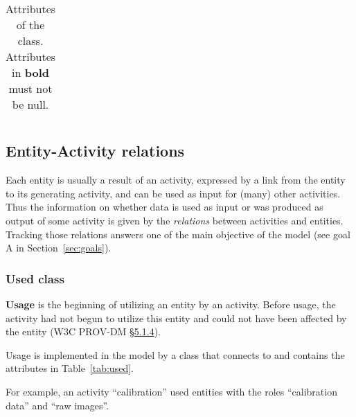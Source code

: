\begin{table}[ht]
\begin{tabulary}{1.0\textwidth}{llL}
\bottomrule
\end{tabulary}
\caption[Attributes of the  class.]{Attributes of the  class. Attributes in \textbf{bold} must not be null.}\label{tab:activity}
\end{table}




\subsection{Entity-Activity relations}
\label{sec:entity-activity-relations}

Each entity is usually a result of an activity, expressed by a link from the entity to its generating activity, and can be used as input for (many) other activities.
Thus the information on whether data is used as input or was produced as output of some activity is given by the \emph{relations} between activities and entities.
Tracking those relations answers one of the main objective of the model (see goal A in Section~\ref{sec:goals}).


\subsubsection{Used class}

\textbf{Usage} is the beginning of utilizing an entity by an activity. Before usage, the activity had not begun to utilize this entity and could not have been affected by the entity (W3C PROV-DM \href{https://www.w3.org/TR/prov-dm/#term-Usage}{\S5.1.4}).

Usage is implemented in the model by a class  that connects  to  and contains the attributes in Table~\ref{tab:used}.

For example, an activity ``calibration'' used entities with the roles ``calibration data'' and ``raw images''.

